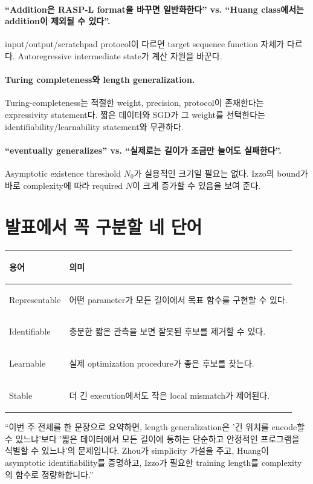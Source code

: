\documentclass[11pt,a4paper,oneside,openany]{memoir}
\theoremstyle{definition}
\begin{document}
\paragraph{``Addition은 RASP-L format을 바꾸면 일반화한다'' vs. ``Huang class에서는 addition이 제외될 수 있다''.}
input/output/scratchpad protocol이 다르면 target sequence function 자체가 다르다.
Autoregressive intermediate state가 계산 자원을 바꾼다.

\paragraph{Turing completeness와 length generalization.}
Turing-completeness는 적절한 weight, precision, protocol이 존재한다는 expressivity statement다.
짧은 데이터와 SGD가 그 weight를 선택한다는 identifiability/learnability statement와 무관하다.

\paragraph{``eventually generalizes'' vs. ``실제로는 길이가 조금만 늘어도 실패한다''.}
Asymptotic existence threshold $N_0$가 실용적인 크기일 필요는 없다.
Izzo의 bound가 바로 complexity에 따라 required $N$이 크게 증가할 수 있음을 보여 준다.

\section{발표에서 꼭 구분할 네 단어}

\begin{center}
\small
\begin{tabularx}{\textwidth}{>{\bfseries\raggedright\arraybackslash}p{}Y}
\toprule
용어 & 의미 \\
\midrule
Representable & 어떤 parameter가 모든 길이에서 목표 함수를 구현할 수 있다. \\
Identifiable & 충분한 짧은 관측을 보면 잘못된 후보를 제거할 수 있다. \\
Learnable & 실제 optimization procedure가 좋은 후보를 찾는다. \\
Stable & 더 긴 execution에서도 작은 local mismatch가 제어된다. \\
\bottomrule
\end{tabularx}
\end{center}

\begin{presentbox}
``이번 주 전체를 한 문장으로 요약하면, length generalization은 '긴 위치를 encode할 수 있느냐'보다 '짧은 데이터에서 모든 길이에 통하는 단순하고 안정적인 프로그램을 식별할 수 있느냐'의 문제입니다. Zhou가 simplicity 가설을 주고, Huang이 asymptotic identifiability를 증명하고, Izzo가 필요한 training length를 complexity의 함수로 정량화합니다.''
\end{presentbox}
\end{document}
